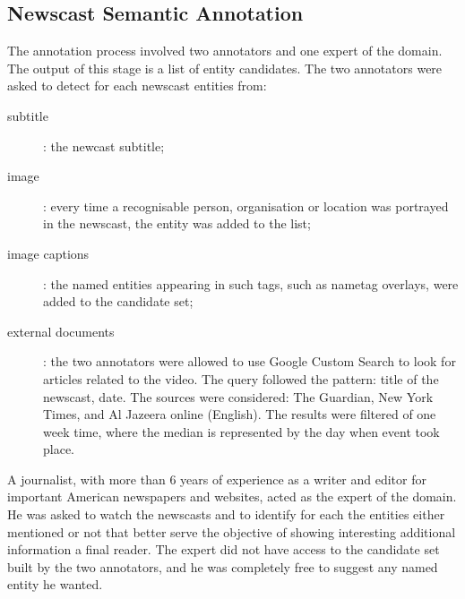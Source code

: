 \documentclass{llncs}
\begin{document}
\subsection{Newscast Semantic Annotation}
The annotation process involved two annotators and one expert of the domain. The output of this stage is a list of entity candidates. The two annotators were asked to detect for each newscast entities from: 
\begin{description}
\item[subtitle]: the newcast subtitle;
\item[image]: every time a recognisable person, organisation or location was portrayed in the newscast, the entity was added to the list;
\item[image captions]: the named entities appearing in such tags, such as nametag overlays, were added to the candidate set;
\item[external documents]: the two annotators were allowed to use Google Custom Search to look for articles related to the video. The query followed the pattern: title of the newscast, date. The sources were considered: The Guardian, New York Times, and Al Jazeera online (English). The results were filtered of one week time, where the median is represented by the day when event took place.
\end{description}

A journalist, with more than 6 years of experience as a writer and editor for important American newspapers and websites, acted as the expert of the domain. He was asked to watch the newscasts and to identify for each the entities either mentioned or not that better serve the objective of showing interesting additional information a final reader. The expert did not have access to the candidate set built by the two annotators, and he was completely free to suggest any named entity he wanted. 
\end{document}
